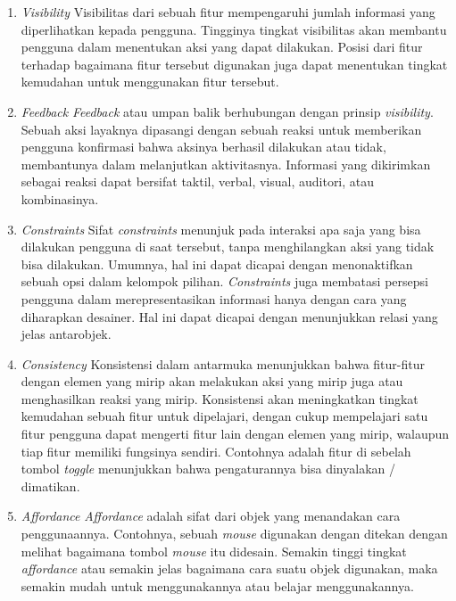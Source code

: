 \begin{enumerate}
  \item \textit{Visibility}
  \subitem Visibilitas dari sebuah fitur mempengaruhi jumlah informasi yang diperlihatkan kepada pengguna. Tingginya tingkat visibilitas akan membantu pengguna dalam menentukan aksi yang dapat dilakukan. Posisi dari fitur terhadap bagaimana fitur tersebut digunakan juga dapat menentukan tingkat kemudahan untuk menggunakan fitur tersebut.
   
  \item \textit{Feedback}
  \subitem \textit{Feedback} atau umpan balik berhubungan dengan prinsip \textit{visibility}. Sebuah aksi layaknya dipasangi dengan sebuah reaksi untuk memberikan pengguna konfirmasi bahwa aksinya berhasil dilakukan atau tidak, membantunya dalam melanjutkan aktivitasnya. Informasi yang dikirimkan sebagai reaksi dapat bersifat taktil, verbal, visual, auditori, atau kombinasinya.
   
  \item \textit{Constraints}
  \subitem Sifat \textit{constraints} menunjuk pada interaksi apa saja yang bisa dilakukan pengguna di saat tersebut, tanpa menghilangkan aksi yang tidak bisa dilakukan. Umumnya, hal ini dapat dicapai dengan menonaktifkan sebuah opsi dalam kelompok pilihan. \textit{Constraints} juga membatasi persepsi pengguna dalam merepresentasikan informasi hanya dengan cara yang diharapkan desainer. Hal ini dapat dicapai dengan menunjukkan relasi yang jelas antarobjek.
   
  \item \textit{Consistency}
  \subitem Konsistensi dalam antarmuka menunjukkan bahwa fitur-fitur dengan elemen yang mirip akan melakukan aksi yang mirip juga atau menghasilkan reaksi yang mirip. Konsistensi akan meningkatkan tingkat kemudahan sebuah fitur untuk dipelajari, dengan cukup mempelajari satu fitur pengguna dapat mengerti fitur lain dengan elemen yang mirip, walaupun tiap fitur memiliki fungsinya sendiri. Contohnya adalah fitur di sebelah tombol \textit{toggle} menunjukkan bahwa pengaturannya bisa dinyalakan / dimatikan.
   
  \item \textit{Affordance}
  \subitem \textit{Affordance} adalah sifat dari objek yang menandakan cara penggunaannya. Contohnya, sebuah \textit{mouse} digunakan dengan ditekan dengan melihat bagaimana tombol \textit{mouse} itu didesain. Semakin tinggi tingkat \textit{affordance} atau semakin jelas bagaimana cara suatu objek digunakan, maka semakin mudah untuk menggunakannya atau belajar menggunakannya.
   
\end{enumerate}

